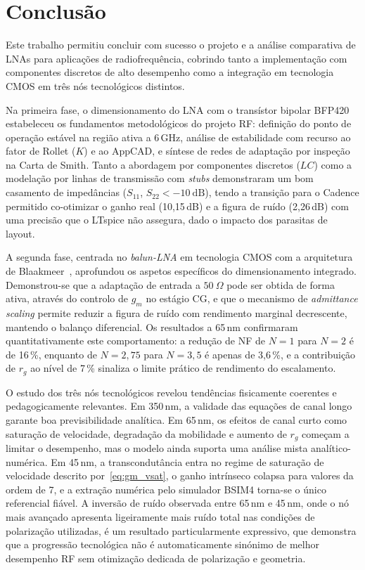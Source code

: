 \section{Conclusão}
\label{sec:conclusao}

Este trabalho permitiu concluir com sucesso o projeto e a análise comparativa de LNAs para aplicações
de radiofrequência, cobrindo tanto a implementação com componentes discretos de alto desempenho como
a integração em tecnologia CMOS em três nós tecnológicos distintos.

Na primeira fase, o dimensionamento do LNA com o transístor bipolar BFP420 estabeleceu os
fundamentos metodológicos do projeto RF: definição do ponto de operação estável na região ativa a
6\,GHz, análise de estabilidade com recurso ao fator de Rollet ($K$) e ao AppCAD, e síntese de redes
de adaptação por inspeção na Carta de Smith. Tanto a abordagem por componentes discretos ($LC$) como
a modelação por linhas de transmissão com \textit{stubs} demonstraram um bom casamento de impedâncias
($S_{11}$, $S_{22} < -10~\text{dB}$), tendo a transição para o Cadence permitido co-otimizar o ganho
real (10{,}15\,dB) e a figura de ruído (2{,}26\,dB) com uma precisão que o LTspice não assegura,
dado o impacto dos parasitas de layout.

A segunda fase, centrada no \textit{balun-LNA} em tecnologia CMOS com a arquitetura de
Blaakmeer~\cite{blaakmeer2008}, aprofundou os aspetos específicos do dimensionamento integrado.
Demonstrou-se que a adaptação de entrada a $50~\Omega$ pode ser obtida de forma ativa, através do
controlo de $g_m$ no estágio CG, e que o mecanismo de \textit{admittance scaling} permite reduzir a figura de 
ruído com rendimento marginal decrescente, mantendo o balanço diferencial. Os resultados a 65\,nm confirmaram
quantitativamente este comportamento: a redução de NF de $N=1$ para $N=2$ é de 16\,\%, enquanto de
$N=2{,}75$ para $N=3{,}5$ é apenas de 3{,}6\,\%, e a contribuição de $r_g$ ao nível de 7\,\%
sinaliza o limite prático de rendimento do escalamento.

O estudo dos três nós tecnológicos revelou tendências fisicamente coerentes e pedagogicamente
relevantes. Em 350\,nm, a validade das equações de canal longo garante boa previsibilidade analítica.
Em 65\,nm, os efeitos de canal curto como saturação de velocidade, degradação da mobilidade e
aumento de $r_g$ começam a limitar o desempenho, mas o modelo ainda suporta uma análise mista
analítico-numérica. Em 45\,nm, a transcondutância entra no regime de saturação de velocidade
descrito por~\eqref{eq:gm_vsat}, o ganho intrínseco colapsa para valores da ordem de 7, e a
extração numérica pelo simulador BSIM4 torna-se o único referencial fiável. A inversão de ruído
observada entre 65\,nm e 45\,nm, onde o nó mais avançado apresenta ligeiramente mais ruído total
nas condições de polarização utilizadas, é um resultado particularmente expressivo, que demonstra
que a progressão tecnológica não é automaticamente sinónimo de melhor desempenho RF sem otimização
dedicada de polarização e geometria.

